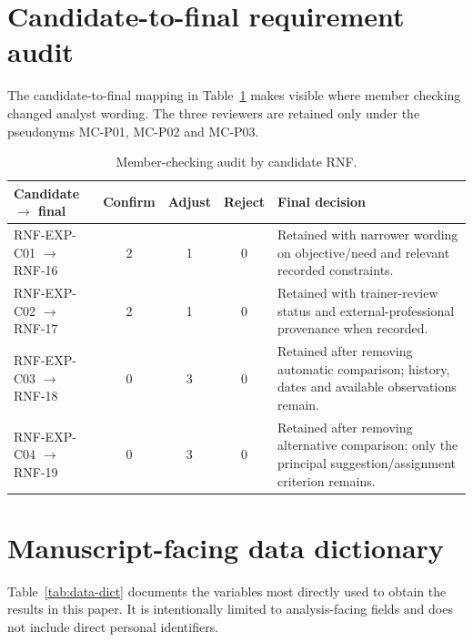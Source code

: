 \documentclass[pdflatex,sn-basic]{sn-jnl}
\begin{document}
\section{Candidate-to-final requirement audit}\label{app:mc-audit}
The candidate-to-final mapping in Table~\ref{tab:mc-audit} makes visible where member checking changed analyst wording. The three reviewers are retained only under the pseudonyms MC-P01, MC-P02 and MC-P03.

\begin{table}[H]
\caption{Member-checking audit by candidate RNF.}\label{tab:mc-audit}
\centering\footnotesize
\begin{tabularx}{\textwidth}{@{}p{2.3cm}cccX@{}}
\toprule
Candidate $\rightarrow$ final & Confirm & Adjust & Reject & Final decision \\
\midrule
RNF-EXP-C01 $\rightarrow$ RNF-16 & 2 & 1 & 0 & Retained with narrower wording on objective/need and relevant recorded constraints.\\
RNF-EXP-C02 $\rightarrow$ RNF-17 & 2 & 1 & 0 & Retained with trainer-review status and external-professional provenance when recorded.\\
RNF-EXP-C03 $\rightarrow$ RNF-18 & 0 & 3 & 0 & Retained after removing automatic comparison; history, dates and available observations remain.\\
RNF-EXP-C04 $\rightarrow$ RNF-19 & 0 & 3 & 0 & Retained after removing alternative comparison; only the principal suggestion/assignment criterion remains.\\
\bottomrule
\end{tabularx}
\end{table}


\section{Manuscript-facing data dictionary}\label{app:data-dict}
Table~\ref{tab:data-dict} documents the variables most directly used to obtain the results in this paper. It is intentionally limited to analysis-facing fields and does not include direct personal identifiers.
\end{document}
